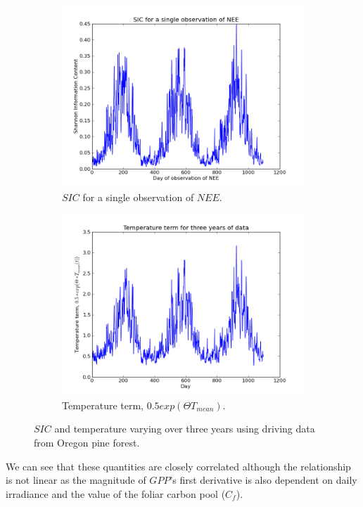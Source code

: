 \documentclass[11pt]{article}
\begin{document}
\begin{figure}
\centering
\begin{subfigure}{.5\textwidth}
  \centering
  \includegraphics[width=.9\linewidth]{SIC1Obs_0_1095.png}
  \caption{$SIC$ for a single observation of $NEE$.}
  \label{fig:sub1}
\end{subfigure}%
\begin{subfigure}{.5\textwidth}
  \centering
  \includegraphics[width=.9\linewidth]{Temp_0_1095.png}
  \caption{Temperature term, $0.5exp(\Theta T_{mean})$.}
  \label{fig:sub2}
\end{subfigure}
\caption{$SIC$ and temperature varying over three years using driving data from Oregon pine forest.}
\label{fig:test}
\end{figure}

We can see that these quantities are closely correlated although the relationship is not linear as the magnitude of $GPP$'s first derivative is also dependent on daily irradiance and the value of the foliar carbon pool ($C_f$). 

{}

\end{document}
